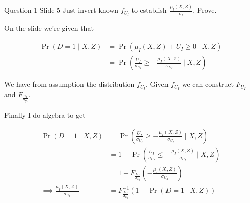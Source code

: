 \documentclass{article}
\begin{document}
\begin{problem}{Question 1 Slide 5}
Just invert known $f_{U_{l}}$ to establish $\frac{\mu_{l}(X, Z)}{\sigma_{l}}$. Prove.
\end{problem}
\begin{solution}

On the slide we're given that

$$
\begin{aligned}
\operatorname{Pr}(D=1 \mid X, Z) &=\operatorname{Pr}\left(\mu_{I}(X, Z)+U_{I} \geq 0 \mid X, Z\right) \\
&=\operatorname{Pr}\left(\frac{U_{I}}{\sigma_{U_{I}}} \geq-\frac{\mu_{I}(X, Z)}{\sigma_{U_{I}}} \mid X, Z\right)
\end{aligned}
$$

We have from assumption the distribution $f_{U_I}$. Given $f_{U_I}$ we can construct $F_{U_I}$ and $F_{\frac{U_{I}}{\sigma_{U_{I}}}}$.

Finally I do algebra to get 

\begin{align*}
    \operatorname{Pr}(D=1 \mid X, Z) &= \operatorname{Pr}\left(\frac{U_{I}}{\sigma_{U_{I}}} \geq-\frac{\mu_{I}(X, Z)}{\sigma_{U_{I}}} \mid X, Z\right) \\
    &= 1- \operatorname{Pr}\left(\frac{U_{I}}{\sigma_{U_{I}}} \leq-\frac{\mu_{I}(X, Z)}{\sigma_{U_{I}}} \mid X, Z\right)\\
    &= 1-F_{\frac{U_{I}}{\sigma_{U_{I}}}}\left(-\frac{\mu_{I}(X, Z)}{\sigma_{U_{I}}}\right) \\
\implies \frac{\mu_{I}(X, Z)}{\sigma_{U_{I}}}&=F_{\frac{U_{I}}{\sigma_{U_{I}}}}^{-1}(1-\operatorname{Pr}(D=1 \mid X, Z))
\end{align*}
\end{solution}
\end{document}
